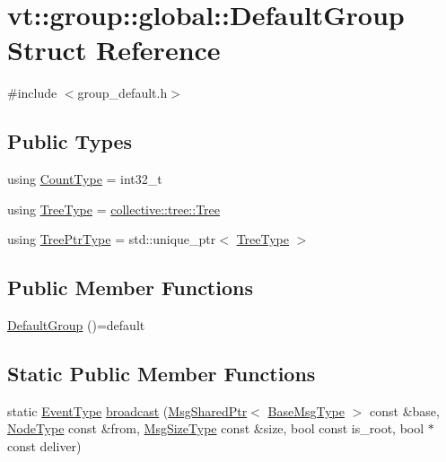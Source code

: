 \hypertarget{structvt_1_1group_1_1global_1_1_default_group}{}\section{vt\+:\+:group\+:\+:global\+:\+:Default\+Group Struct Reference}
\label{structvt_1_1group_1_1global_1_1_default_group}


{\ttfamily \#include $<$group\+\_\+default.\+h$>$}

\subsection*{Public Types}
\begin{DoxyCompactItemize}
\item 
using \hyperlink{structvt_1_1group_1_1global_1_1_default_group_a838e3ed0bd877d6ff703705c00c66e95}{Count\+Type} = int32\+\_\+t
\item 
using \hyperlink{structvt_1_1group_1_1global_1_1_default_group_a86d7ec049ad79c17fcb6b428534d0c1c}{Tree\+Type} = \hyperlink{structvt_1_1collective_1_1tree_1_1_tree}{collective\+::tree\+::\+Tree}
\item 
using \hyperlink{structvt_1_1group_1_1global_1_1_default_group_ab4b43c814196cd22463cfa0caad333d6}{Tree\+Ptr\+Type} = std\+::unique\+\_\+ptr$<$ \hyperlink{structvt_1_1group_1_1global_1_1_default_group_a86d7ec049ad79c17fcb6b428534d0c1c}{Tree\+Type} $>$
\end{DoxyCompactItemize}
\subsection*{Public Member Functions}
\begin{DoxyCompactItemize}
\item 
\hyperlink{structvt_1_1group_1_1global_1_1_default_group_ab21200c02abd2a011352bee173951942}{Default\+Group} ()=default
\end{DoxyCompactItemize}
\subsection*{Static Public Member Functions}
\begin{DoxyCompactItemize}
\item 
static \hyperlink{namespacevt_a009267401def7ae8bf201892222d060f}{Event\+Type} \hyperlink{structvt_1_1group_1_1global_1_1_default_group_a7e175288780bf78baf4bdabf8d1292f0}{broadcast} (\hyperlink{namespacevt_ab2b3d506ec8e8d1540aede826d84a239}{Msg\+Shared\+Ptr}$<$ \hyperlink{namespacevt_a44d0d4e144748f2b19a1cfd962f50338}{Base\+Msg\+Type} $>$ const \&base, \hyperlink{namespacevt_a866da9d0efc19c0a1ce79e9e492f47e2}{Node\+Type} const \&from, \hyperlink{namespacevt_a408e86a8c7c89309b52907dc5a513924}{Msg\+Size\+Type} const \&size, bool const is\+\_\+root, bool $\ast$const deliver)
\end{DoxyCompactItemize}
